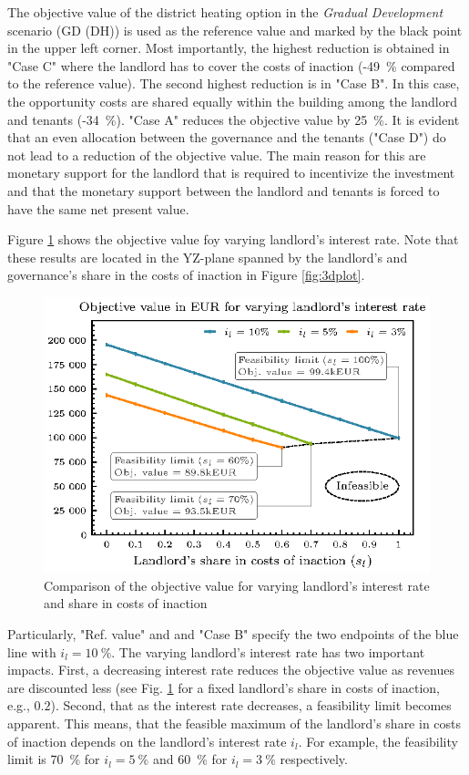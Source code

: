 The objective value of the district heating option in the \textit{Gradual Development} scenario (GD (DH)) is used as the reference value and marked by the black point in the upper left corner. Most importantly, the highest reduction is obtained in "Case C" where the landlord has to cover the costs of inaction (-\SI{49}{\%} compared to the reference value). The second highest reduction is in "Case B". In this case, the opportunity costs are shared equally within the building among the landlord and tenants (-\SI{34}{\%}). "Case A" reduces the objective value by \SI{25}{\%}.  It is evident that an even allocation between the governance and the tenants ("Case D") do not lead to a reduction of the objective value. The main reason for this are monetary support for the landlord that is required to incentivize the investment and that the monetary support between the landlord and tenants is forced to have the same net present value.\vspace{0.5cm}

Figure \ref{fig:feasible} shows the objective value foy varying landlord's interest rate. Note that these results are located in the YZ-plane spanned by the landlord's and governance's share in the costs of inaction in Figure \ref{fig:3dplot}. 

\begin{figure}[h]
	\centering
	\includegraphics[width=0.75\linewidth]{figures/4_Results/fig_feasible/feasible.eps}
	\caption{Comparison of the objective value for varying landlord's interest rate and share in costs of inaction}
	\label{fig:feasible}
\end{figure}

Particularly, "Ref. value" and and "Case B" specify the two endpoints of the blue line with $i_l=\SI{10}{\%}$. The varying landlord's interest rate has two important impacts. First, a decreasing interest rate reduces the objective value as revenues are discounted less (see Fig. \ref{fig:feasible} for a fixed landlord's share in costs of inaction, e.g., $0.2$). Second, that as the interest rate decreases, a feasibility limit becomes apparent. This means, that the feasible maximum of the landlord's share in costs of inaction depends on the landlord's interest rate $i_l$. For example, the feasibility limit is \SI{70}{\%} for $i_l=\SI{5}{\%}$ and \SI{60}{\%} for $i_l=\SI{3}{\%}$ respectively. 



